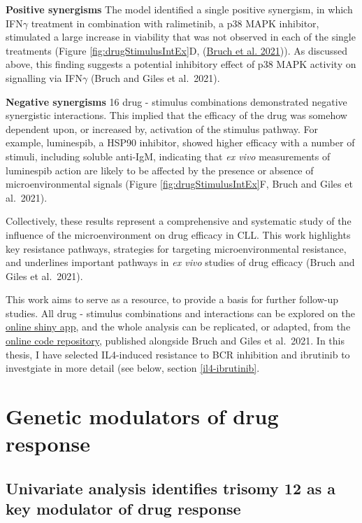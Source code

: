 \documentclass[11pt, a4paper, twosided]{book}
\begin{document}
\textbf{Positive synergisms} The model identified a single positive synergism, in which IFN\(\gamma\) treatment in combination with ralimetinib, a p38 MAPK inhibitor, stimulated a large increase in viability that was not observed in each of the single treatments (Figure \ref{fig:drugStimulusIntEx}D, (\protect\hyperlink{ref-Giles2021}{Bruch et al. 2021})). As discussed above, this finding suggests a potential inhibitory effect of p38 MAPK activity on signalling via IFN\(\gamma\) (Bruch and Giles et al.~2021).

\textbf{Negative synergisms} 16 drug - stimulus combinations demonstrated negative synergistic interactions. This implied that the efficacy of the drug was somehow dependent upon, or increased by, activation of the stimulus pathway. For example, luminespib, a HSP90 inhibitor, showed higher efficacy with a number of stimuli, including soluble anti-IgM, indicating that \emph{ex vivo} measurements of luminespib action are likely to be affected by the presence or absence of microenvironmental signals (Figure \ref{fig:drugStimulusIntEx}F, Bruch and Giles et al.~2021).

Collectively, these results represent a comprehensive and systematic study of the influence of the microenvironment on drug efficacy in CLL. This work highlights key resistance pathways, strategies for targeting microenvironmental resistance, and underlines important pathways in \emph{ex vivo} studies of drug efficacy (Bruch and Giles et al.~2021).

This work aims to serve as a resource, to provide a basis for further follow-up studies. All drug - stimulus combinations and interactions can be explored on the \href{https://www.imbi.uni-heidelberg.de/dietrichlab/CLL_Microenvironment/}{online shiny app}, and the whole analysis can be replicated, or adapted, from the \href{https://github.com/Huber-group-EMBL/CLLCytokineScreen2021}{online code repository}, published alongside Bruch and Giles et al.~2021. In this thesis, I have selected IL4-induced resistance to BCR inhibition and ibrutinib to investgiate in more detail (see below, section \ref{il4-ibrutinib}.

\hypertarget{mapping-genetic-modulators}{%
\section{Genetic modulators of drug response}\label{mapping-genetic-modulators}}

\hypertarget{univariate-gene-drug-associations}{%
\subsection{Univariate analysis identifies trisomy 12 as a key modulator of drug response}\label{univariate-gene-drug-associations}}
\end{document}
